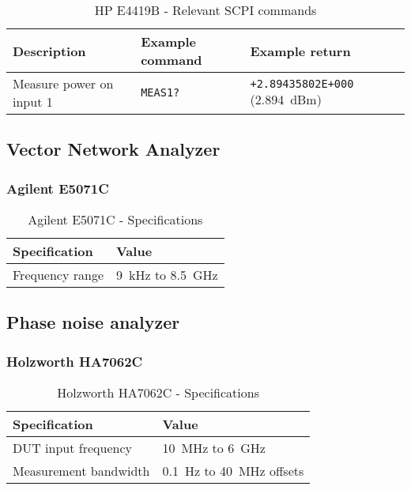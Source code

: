 \begin{table}[H]
	\centering
	\caption{HP E4419B - Relevant SCPI commands}
	\label{tab:hp-E4419B-scpi}
	\begin{tabularx}{\textwidth}{Xll}
		\toprule
		\textbf{Description} & \textbf{Example command} & \textbf{Example return}\\
		\midrule
		Measure power on input 1 & \texttt{MEAS1?} & \texttt{+2.89435802E+000} (\SI{2.894}{dBm}) \\
		\bottomrule
	\end{tabularx}
\end{table}

\subsection{Vector Network Analyzer}
\subsubsection{Agilent E5071C}\label{app:agilent-e5071c}
\begin{table}[H]
	\centering
	\caption{Agilent E5071C - Specifications}
	\label{tab:agilent-E5071C-specs}
	\begin{tabularx}{\textwidth}{ll}
		\toprule
		\textbf{Specification} & \textbf{Value}\\
		\midrule
		Frequency range & \SI{9}{\kHz} to \SI{8.5}{\GHz}
	\end{tabularx}
\end{table}

\subsection{Phase noise analyzer}
\subsubsection{Holzworth HA7062C}\label{app:holzworth-ha7062c}
\begin{table}[H]
	\centering
	\caption{Holzworth HA7062C - Specifications}
	\label{tab:holzworth-ha7062c-specs}
	\begin{tabularx}{\textwidth}{ll}
		\toprule
		\textbf{Specification} & \textbf{Value}\\
		\midrule
		DUT input frequency & \SI{10}{\MHz} to \SI{6}{\GHz}\\
		Measurement bandwidth & \SI{0.1}{\Hz} to \SI{40}{\MHz} offsets\\
	\end{tabularx}
\end{table}


